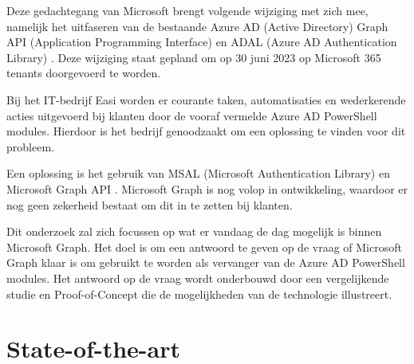 Deze gedachtegang van Microsoft brengt volgende wijziging met zich mee, namelijk het uitfaseren van de bestaande Azure AD (Active Directory) Graph API (Application Programming Interface) en ADAL (Azure AD Authentication Library) \autocite{Sahay2022}. Deze wijziging staat gepland om op 30 juni 2023 op Microsoft 365 tenants doorgevoerd te worden.

Bij het IT-bedrijf Easi worden er courante taken, automatisaties en wederkerende acties uitgevoerd bij klanten door de vooraf vermelde Azure AD PowerShell modules. Hierdoor is het bedrijf genoodzaakt om een oplossing te vinden voor dit probleem.

Een oplossing is het gebruik van MSAL (Microsoft Authentication Library) en Microsoft Graph API \autocite{Microsoft2023}. Microsoft Graph is nog volop in ontwikkeling, waardoor er nog geen zekerheid bestaat om dit in te zetten bij klanten.

Dit onderzoek zal zich focussen op wat er vandaag de dag mogelijk is binnen Microsoft Graph. Het doel is om een antwoord te geven op de vraag of Microsoft Graph klaar is om gebruikt te worden als vervanger van de Azure AD PowerShell modules. Het antwoord op de vraag wordt onderbouwd door een  vergelijkende studie en Proof-of-Concept die de mogelijkheden van de technologie illustreert.



\section{State-of-the-art}%
\label{sec:state-of-the-art}

